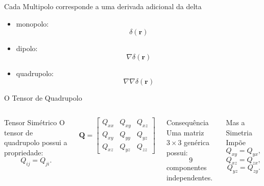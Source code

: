 \documentclass[aspectratio=169]{beamer}
\begin{document}
\begin{frame}
\begin{alertblock}{Cada Multipolo corresponde a uma derivada adicional da delta}
\begin{itemize}
\item monopolo:
\[
\delta(\mathbf r)
\]
\item dipolo:
\[
\nabla\delta(\mathbf r)
\]
\item quadrupolo:
\[
\nabla\nabla\delta(\mathbf r)
\]
\end{itemize}
\end{alertblock}

\end{frame}

\begin{frame}{O Tensor de Quadrupolo}

\begin{columns}[T]


\begin{mybox}{Tensor Simétrico}
O tensor de quadrupolo possui a propriedade:
\[
Q_{ij}=Q_{ji}.
\]
\end{mybox}

\vspace{0.2cm}

\begin{eqbox}
\begin{equation}
\mathbf Q=
\begin{bmatrix}
Q_{xx} & Q_{xy} & Q_{xz}
\\
Q_{xy} & Q_{yy} & Q_{yz}
\\
Q_{xz} & Q_{yz} & Q_{zz}
\end{bmatrix}
\tag{4.57}
\end{equation}
\end{eqbox}


\begin{alertblock}{Consequência}
Uma matriz \(3\times3\) genérica possui:
\[
9
\]
componentes independentes.
\end{alertblock}

\vspace{0.2cm}

\begin{mybox}{Mas a Simetria Impõe}
\[
Q_{xy}=Q_{yx},
\]
\[
Q_{xz}=Q_{zx},
\]
\[
Q_{yz}=Q_{zy}.
\]
\end{mybox}


\end{columns}
\end{frame}
\end{document}
